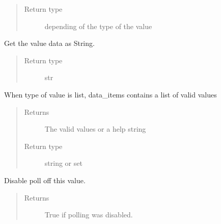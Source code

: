 \documentclass[letterpaper,10pt,english]{sphinxmanual}
\begin{document}
\begin{fulllineitems}
\begin{fulllineitems}
\begin{quote}
\begin{description}
\item[{Return type}] \leavevmode
depending of the type of the value

\end{description}\end{quote}

\end{fulllineitems}


\begin{fulllineitems}
\label{value:openzwave.value.ZWaveValue.data_as_string}
Get the value data as String.
\begin{quote}\begin{description}
\item[{Return type}] \leavevmode
str

\end{description}\end{quote}

\end{fulllineitems}


\begin{fulllineitems}
\label{value:openzwave.value.ZWaveValue.data_items}
When type of value is list, data\_items contains a list of valid values
\begin{quote}\begin{description}
\item[{Returns}] \leavevmode
The valid values or a help string

\item[{Return type}] \leavevmode
string or set

\end{description}\end{quote}

\end{fulllineitems}


\begin{fulllineitems}
\label{value:openzwave.value.ZWaveValue.disable_poll}
Disable poll off this value.
\begin{quote}\begin{description}
\item[{Returns}] \leavevmode
True if polling was disabled.


\end{description}
\end{quote}
\end{fulllineitems}
\end{fulllineitems}
\end{document}
